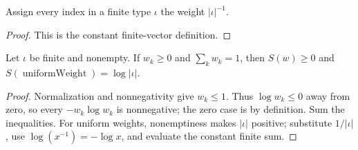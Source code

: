 \begin{definition}
\label{def:entropy:uniform}
Assign every index in a finite type $\iota$ the weight $|\iota|^{-1}$.
\end{definition}
\begin{proof}This is the constant finite-vector definition.\end{proof}

\begin{theorem}
\label{thm:physics:entropy:target}
Let $\iota$ be finite and nonempty. If $w_k\ge0$ and $\sum_kw_k=1$, then $S(w)\ge0$ and $S(\operatorname{uniformWeight})=\log|\iota|$.
\end{theorem}
\begin{proof}
Normalization and nonnegativity give $w_k\le1$. Thus $\log w_k\le0$ away from zero, so every $-w_k\log w_k$ is nonnegative; the zero case is by definition. Sum the inequalities. For uniform weights, nonemptiness makes $|\iota|$ positive; substitute $1/|\iota|$, use $\log(x^{-1})=-\log x$, and evaluate the constant finite sum.
\end{proof}
